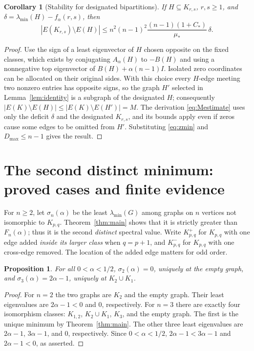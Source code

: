 \documentclass[11pt]{amsart}
\newtheorem{proposition}[theorem]{Proposition}
\newtheorem{corollary}[theorem]{Corollary}
\theoremstyle{definition}
\newcommand{\Aa}{A_{\alpha}}
\newcommand{\lam}{\lambda_{\min}}
\begin{document}
\begin{corollary}[Stability for designated bipartitions]\label{cor:fixedstable}
If $H\subseteq K_{r,s}$, $r,s\ge1$, and $\delta=\lam(H)-f_\alpha(r,s)$, then
\[
 |E(K_{r,s})\setminus E(H)|\le
 n^2(n-1)^2\frac{(n-1)(1+C_*)}{\mu_*}\,\delta.
\]
\end{corollary}
\begin{proof}
Use the sign of a least eigenvector of $H$ chosen opposite on the fixed classes, which exists by conjugating $\Aa(H)$ to $-B(H)$ and using a nonnegative top eigenvector of $B(H)+\alpha(n-1)I$. Isolated zero coordinates can be allocated on their original sides. With this choice every $H$-edge meeting two nonzero entries has opposite signs, so the graph $H'$ selected in Lemma~\ref{lem:identity} is a subgraph of the designated $H$; consequently $|E(K)\setminus E(H)|\le|E(K)\setminus E(H')|=M$. The derivation \eqref{eq:Mestimate} uses only the deficit $\delta$ and the designated $K_{r,s}$, and its bounds apply even if zeros cause some edges to be omitted from $H'$. Substituting \eqref{eq:zmin} and $D_{\max}\le n-1$ gives the result.
\end{proof}

\section{The second distinct minimum: proved cases and finite evidence}
For $n\ge2$, let $\sigma_n(\alpha)$ be the least $\lam(G)$ among graphs on $n$ vertices not isomorphic to $K_{p,q}$. Theorem~\ref{thm:main} shows that it is strictly greater than $F_n(\alpha)$; thus it is the second \emph{distinct} spectral value. Write $K_{p,q}^{+}$ for $K_{p,q}$ with one edge added \emph{inside its larger class} when $q=p+1$, and $K_{p,q}^{-}$ for $K_{p,q}$ with one cross-edge removed. The location of the added edge matters for odd order.

\begin{proposition}\label{prop:smallsecond}
For all $0<\alpha<1/2$, $\sigma_2(\alpha)=0$, uniquely at the empty graph, and $\sigma_3(\alpha)=2\alpha-1$, uniquely at $K_2\cup K_1$.
\end{proposition}
\begin{proof}
For $n=2$ the two graphs are $K_2$ and the empty graph. Their least eigenvalues are $2\alpha-1<0$ and $0$, respectively. For $n=3$ there are exactly four isomorphism classes: $K_{1,2}$, $K_2\cup K_1$, $K_3$, and the empty graph. The first is the unique minimum by Theorem~\ref{thm:main}. The other three least eigenvalues are $2\alpha-1$, $3\alpha-1$, and $0$, respectively. Since $0<\alpha<1/2$, $2\alpha-1<3\alpha-1$ and $2\alpha-1<0$, as asserted.
\end{proof}
\end{document}
